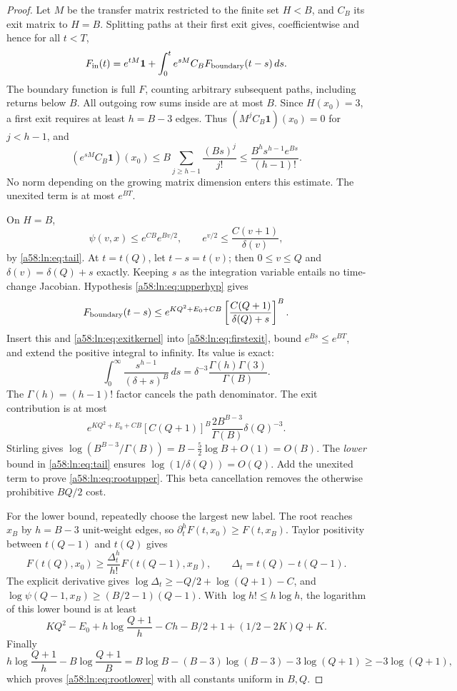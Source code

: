 \documentclass[11pt,letterpaper]{article}
\theoremstyle{remark}
\newcommand{\one}{\mathbf 1}
\newcommand{\dd}{\,d}
\begin{document}
\begin{proof}
Let $M$ be the transfer matrix restricted to the finite set $H<B$, and
$C_B$ its exit matrix to $H=B$. Splitting paths at their first exit gives,
coefficientwise and hence for all $t<T$,
\begin{equation}\label{a58:ln:eq:firstexit}
 F_{\rm in}(t)=e^{tM}\one+
     \int_0^t e^{sM}C_BF_{\rm boundary}(t-s)\dd s.
\end{equation}
The boundary function is full $F$, counting arbitrary subsequent paths,
including returns below $B$. All outgoing row sums inside are at most
$B$. Since $H(x_0)=3$, a first exit requires at least $h=B-3$ edges.
Thus $(M^jC_B\one)(x_0)=0$ for $j<h-1$, and
\begin{equation}\label{a58:ln:eq:exitkernel}
 (e^{sM}C_B\one)(x_0)
 \le B\sum_{j\ge h-1}\frac{(Bs)^j}{j!}
 \le\frac{B^hs^{h-1}e^{Bs}}{(h-1)!}.
\end{equation}
No norm depending on the growing matrix dimension enters this estimate.
The unexited term is at most $e^{BT}$.

On $H=B$,
\[
 \psi(v,x)\le e^{CB}e^{Bv/2},\qquad
 e^{v/2}\le\frac{C(v+1)}{\delta(v)},
\]
by \eqref{a58:ln:eq:tail}. At $t=t(Q)$, let $t-s=t(v)$; then
$0\le v\le Q$ and $\delta(v)=\delta(Q)+s$ exactly. Keeping $s$ as the
integration variable entails no time-change Jacobian. Hypothesis
\eqref{a58:ln:eq:upperhyp} gives
\[
 F_{\rm boundary}(t-s)\le
 e^{KQ^2+E_0+CB}\left[\frac{C(Q+1)}{\delta(Q)+s}\right]^B.
\]
Insert this and \eqref{a58:ln:eq:exitkernel} into \eqref{a58:ln:eq:firstexit}, bound
$e^{Bs}\le e^{BT}$, and extend the positive integral to infinity. Its
value is exact:
\begin{equation}\label{a58:ln:eq:beta}
 \int_0^\infty\frac{s^{h-1}}{(\delta+s)^B}\dd s
 =\delta^{-3}\frac{\Gamma(h)\Gamma(3)}{\Gamma(B)}.
\end{equation}
The $\Gamma(h)=(h-1)!$ factor cancels the path denominator. The exit
contribution is at most
\begin{equation}\label{a58:ln:eq:betacancel}
 e^{KQ^2+E_0+CB}[C(Q+1)]^B
 \frac{2B^{B-3}}{\Gamma(B)}\delta(Q)^{-3}.
\end{equation}
Stirling gives
$\log(B^{B-3}/\Gamma(B))=B-\tfrac52\log B+O(1)=O(B)$.
The \emph{lower} bound in \eqref{a58:ln:eq:tail} ensures
$\log(1/\delta(Q))=O(Q)$. Add the unexited term to prove
\eqref{a58:ln:eq:rootupper}. This beta cancellation removes the otherwise
prohibitive $BQ/2$ cost.

For the lower bound, repeatedly choose the largest new label. The root
reaches $x_B$ by $h=B-3$ unit-weight edges, so
$\partial_t^hF(t,x_0)\ge F(t,x_B)$. Taylor positivity between
$t(Q-1)$ and $t(Q)$ gives
\[
 F(t(Q),x_0)\ge\frac{\Delta_t^h}{h!}F(t(Q-1),x_B),
 \qquad \Delta_t=t(Q)-t(Q-1).
\]
The explicit derivative gives
$\log\Delta_t\ge-Q/2+\log(Q+1)-C$, and
$\log\psi(Q-1,x_B)\ge(B/2-1)(Q-1)$.
With $\log h!\le h\log h$, the logarithm of this lower bound is at least
\[
 KQ^2-E_0+h\log\frac{Q+1}{h}-Ch-B/2+1
                       +(1/2-2K)Q+K.
\]
Finally
\[
 h\log\frac{Q+1}{h}-B\log\frac{Q+1}{B}
 =B\log B-(B-3)\log(B-3)-3\log(Q+1)
 \ge-3\log(Q+1),
\]
which proves \eqref{a58:ln:eq:rootlower} with all constants uniform in $B,Q$.
\end{proof}
\end{document}
